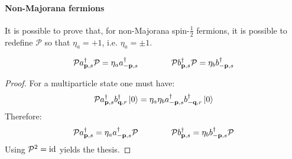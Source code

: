 \paragraph{Non-Majorana fermions}

It is possible to prove that, for non-Majorana spin-$ \frac{1}{2} $ fermions, it is possible to redefine $ \mathcal{P} $ so that $ \eta_a = +1 $, i.e. $ \eta_a = \pm 1 $.

\begin{proposition}{}{}
  \begin{equation}
    \mathcal{P} a_{\mathbf{p},s}^\dagger \mathcal{P} = \eta_a a_{-\mathbf{p},s}^\dagger
    \qquad \qquad
    \mathcal{P} b_{\mathbf{p},s}^\dagger \mathcal{P} = \eta_b b_{-\mathbf{p},s}^\dagger
    \label{eq:2.29}
  \end{equation}

  \tcblower

  \begin{proof}
    For a multiparticle state one must have:
    \begin{equation*}
      \mathcal{P} a_{\mathbf{p},s}^\dagger b_{\mathbf{q},r}^\dagger \ket{0} = \eta_a \eta_b a_{-\mathbf{p},s}^\dagger b_{-\mathbf{q},r}^\dagger \ket{0}
    \end{equation*}
    Therefore:
    \begin{equation*}
      \mathcal{P} a_{\mathbf{p},s}^\dagger = \eta_a a_{-\mathbf{p},s}^\dagger \mathcal{P}
      \qquad \qquad
      \mathcal{P} b_{\mathbf{p},s}^\dagger = \eta_b b_{-\mathbf{p},s}^\dagger \mathcal{P}
    \end{equation*}
    Using $ \mathcal{P}^2 = \operatorname{id} $ yields the thesis.
  \end{proof}
\end{proposition}

